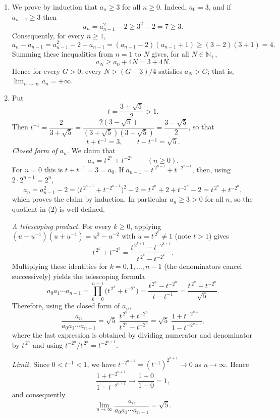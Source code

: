 \documentclass[11pt,a4paper]{article}
\newenvironment{solution}[1]{%
  \par\addvspace{1.7ex}%
  \noindent{\color{solutioncolor}\textbf{#1}}\hspace{0.55em}\ignorespaces}%
  {\par\addvspace{0.9ex}}
\begin{document}
\begin{solution}{Solution 2.3.21}\label{xs:2.3.21}
\begin{enumerate}[(1)]
  \item We prove by induction that $a_n \ge 3$ for all $n \ge 0$. Indeed, $a_0 = 3$, and if $a_{n-1} \ge 3$ then
  \[
  a_n = a_{n-1}^2 - 2 \ge 3^2 - 2 = 7 \ge 3 .
  \]
  Consequently, for every $n \ge 1$,
  \[
  a_n - a_{n-1} = a_{n-1}^2 - 2 - a_{n-1} = (a_{n-1} - 2)(a_{n-1} + 1) \ge (3-2)(3+1) = 4 .
  \]
  Summing these inequalities from $n = 1$ to $N$ gives, for all $N \in \mathbb{N}_+$,
  \[
  a_N \ge a_0 + 4N = 3 + 4N .
  \]
  Hence for every $G > 0$, every $N > (G-3)/4$ satisfies $a_N > G$; that is, $\lim_{n\to\infty} a_n = +\infty$.
  \item Put
  \[
  t = \frac{3+\sqrt{5}}{2} > 1 .
  \]
  Then $t^{-1} = \dfrac{2}{3+\sqrt5} = \dfrac{2(3-\sqrt5)}{(3+\sqrt5)(3-\sqrt5)} = \dfrac{3-\sqrt5}{2}$, so that
  \[
  t + t^{-1} = 3, \qquad t - t^{-1} = \sqrt{5} .
  \]
  \emph{Closed form of $a_n$.} We claim that
  \[
  a_n = t^{\,2^n} + t^{-2^n} \qquad (n \ge 0).
  \]
  For $n = 0$ this is $t + t^{-1} = 3 = a_0$. If $a_{n-1} = t^{\,2^{n-1}} + t^{-2^{n-1}}$, then, using $2\cdot 2^{n-1} = 2^n$,
  \[
  a_n = a_{n-1}^2 - 2 = \bigl(t^{\,2^{n-1}} + t^{-2^{n-1}}\bigr)^2 - 2 = t^{\,2^n} + 2 + t^{-2^n} - 2 = t^{\,2^n} + t^{-2^n},
  \]
  which proves the claim by induction. In particular $a_n \ge 3 > 0$ for all $n$, so the quotient in (2) is well defined.

  \emph{A telescoping product.} For every $k \ge 0$, applying $(u - u^{-1})(u + u^{-1}) = u^2 - u^{-2}$ with $u = t^{\,2^k} \neq 1$ (note $t > 1$) gives
  \[
  t^{\,2^k} + t^{-2^k} = \frac{t^{\,2^{k+1}} - t^{-2^{k+1}}}{t^{\,2^k} - t^{-2^k}} .
  \]
  Multiplying these identities for $k = 0, 1, \dots, n-1$ (the denominators cancel successively) yields the telescoping formula
  \[
  a_0 a_1 \cdots a_{n-1} = \prod_{k=0}^{n-1}\bigl(t^{\,2^k} + t^{-2^k}\bigr)
  = \frac{t^{\,2^n} - t^{-2^n}}{t - t^{-1}}
  = \frac{t^{\,2^n} - t^{-2^n}}{\sqrt5} .
  \]
  Therefore, using the closed form of $a_n$,
  \[
  \frac{a_n}{a_0 a_1 \cdots a_{n-1}}
  = \sqrt5\;\frac{t^{\,2^n} + t^{-2^n}}{t^{\,2^n} - t^{-2^n}}
  = \sqrt5\;\frac{1 + t^{-2^{n+1}}}{1 - t^{-2^{n+1}}} ,
  \]
  where the last expression is obtained by dividing numerator and denominator by $t^{\,2^n}$ and using $t^{-2^n}/t^{\,2^n} = t^{-2^{n+1}}$.

  \emph{Limit.} Since $0 < t^{-1} < 1$, we have $t^{-2^{n+1}} = (t^{-1})^{2^{n+1}} \to 0$ as $n \to \infty$. Hence
  \[
  \frac{1 + t^{-2^{n+1}}}{1 - t^{-2^{n+1}}} \longrightarrow \frac{1+0}{1-0} = 1 ,
  \]
  and consequently
  \[
  \lim_{n\to\infty} \frac{a_n}{a_0 a_1 \cdots a_{n-1}} = \sqrt5 .
  \]
\end{enumerate}
\end{solution}
\end{document}
